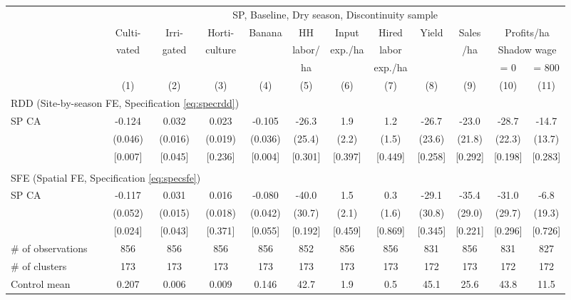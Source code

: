 \begin{tabular}{lccccccccccc}
\hline \hline
 & \multicolumn{11}{c}{SP, Baseline, Dry season, Discontinuity sample} \\
\cmidrule(lr){2-12}
 & Culti- & Irri- & Horti- & Banana & HH & Input & Hired & Yield & Sales & \multicolumn{2}{c}{Profits/ha} \\
 & vated & gated & culture & & labor/ & exp./ha & labor & & /ha & \multicolumn{2}{c}{Shadow wage} \\
 & & & & & ha & & exp./ha & & & = 0 & = 800 \\
\cmidrule(lr){2-2}\cmidrule(lr){3-3}\cmidrule(lr){4-4}\cmidrule(lr){5-5}\cmidrule(lr){6-6}\cmidrule(lr){7-7}\cmidrule(lr){8-8}\cmidrule(lr){9-9}\cmidrule(lr){10-10}\cmidrule(lr){11-11}\cmidrule(lr){12-12}
 & (1) & (2) & (3) & (4) & (5) & (6) & (7) & (8) & (9) & (10) & (11) \\
\hline
\multicolumn{4}{l}{RDD (Site-by-season FE, Specification \ref{eq:specrdd})} & & & & & & & & \\
\cmidrule(lr){1-4}
SP CA & -0.124\hphantom{-} & 0.032 & 0.023 & -0.105\hphantom{-} & -26.3\hphantom{-} & 1.9 & 1.2 & -26.7\hphantom{-} & -23.0\hphantom{-} & -28.7\hphantom{-} & -14.7\hphantom{-} \\
 & (0.046) & (0.016) & (0.019) & (0.036) & (25.4) & (2.2) & (1.5) & (23.6) & (21.8) & (22.3) & (13.7) \\
 & [0.007] & [0.045] & [0.236] & [0.004] & [0.301] & [0.397] & [0.449] & [0.258] & [0.292] & [0.198] & [0.283] \\
\\[-0.5em]
\multicolumn{4}{l}{SFE (Spatial FE, Specification \ref{eq:specsfe})} & & & & & & & & \\
\cmidrule(lr){1-4}
SP CA & -0.117\hphantom{-} & 0.031 & 0.016 & -0.080\hphantom{-} & -40.0\hphantom{-} & 1.5 & 0.3 & -29.1\hphantom{-} & -35.4\hphantom{-} & -31.0\hphantom{-} & -6.8\hphantom{-} \\
 & (0.052) & (0.015) & (0.018) & (0.042) & (30.7) & (2.1) & (1.6) & (30.8) & (29.0) & (29.7) & (19.3) \\
 & [0.024] & [0.043] & [0.371] & [0.055] & [0.192] & [0.459] & [0.869] & [0.345] & [0.221] & [0.296] & [0.726] \\
\hline
\# of observations & 856 & 856 & 856 & 856 & 852 & 856 & 856 & 831 & 856 & 831 & 827 \\
\# of clusters & 173 & 173 & 173 & 173 & 173 & 173 & 173 & 172 & 173 & 172 & 172 \\
Control mean & 0.207 & 0.006 & 0.009 & 0.146 & 42.7 & 1.9 & 0.5 & 45.1 & 25.6 & 43.8 & 11.5 \\
\hline
\end{tabular}
